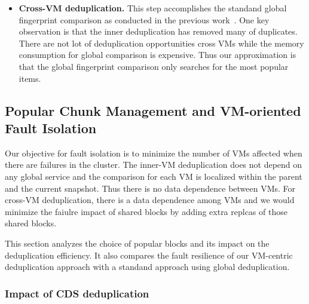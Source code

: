 \begin{itemize}
%

\item \textbf{Cross-VM deduplication.}
This step accomplishes the standand global fingerprint  comparison as conducted
in the previous work~\cite{??}.
One key observation is that the inner deduplication has removed many of duplicates.
There are not lot of deduplication opportunities cross VMs while the memory
consumption for global comparison is expensive.
Thus our approximation is that the global fingerprint  comparison  only searches for the most popular items. 
\end{itemize}

\subsection{Popular Chunk Management and VM-oriented Fault Isolation}
Our objective for fault isolation is to minimize the number of VMs affected when there are failures
in the cluster.  The inner-VM deduplication does not depend on any global service and the comparison
for each VM is localized within the parent and the current snapshot.
Thus there is no data dependence between VMs.
For cross-VM deduplication, there is a data dependence among VMs and we would minimize the faiulre impact
of shared blocks by adding extra replcas of those shared blocks.

This section analyzes the choice of popular blocks and its impact on the deduplication efficiency.
It also  compares the  fault resilience of our VM-centric deduplication approach with a standand approach using 
global deduplication.

\subsubsection{Impact of CDS deduplication}

